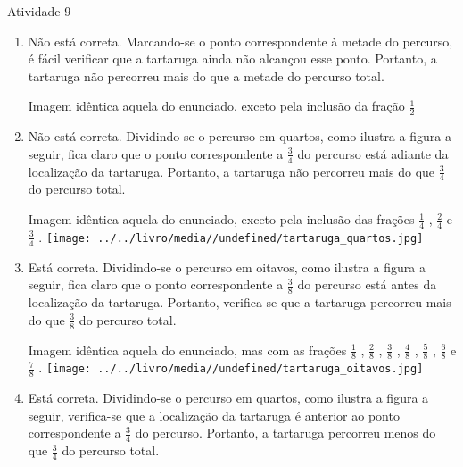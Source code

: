 \documentclass[oneside]{book}
\begin{document}
\begin{multicols}{2}
\begin{resposta*}{Atividade 9}
\begin{enumerate} [\quad a)] %
  \item     Não está correta. Marcando-se o ponto correspondente à metade do percurso, é fácil verificar que a tartaruga ainda não alcançou esse ponto. Portanto, a tartaruga não percorreu mais do que a metade do percurso total.          

\begin{imagem*}[breakable]{}{}   Imagem idêntica aquela do enunciado, exceto pela inclusão da fração   $\frac{1}{2}$  \end{imagem*}

  \item     Não está correta. Dividindo-se o percurso em quartos, como ilustra a figura a seguir, fica claro que o ponto correspondente a     $\frac{3}{4}$     do percurso está adiante da localização da tartaruga. Portanto, a tartaruga não percorreu mais do que     $\frac{3}{4}$     do percurso total.          

\begin{imagem*}[breakable]{}{}   Imagem idêntica aquela do enunciado, exceto pela inclusão das frações   $\frac{1}{4}$  ,   $\frac{2}{4}$   e   $\frac{3}{4}$  .           \texttt{[image: ../../livro/media//undefined/tartaruga\_quartos.jpg]}   \end{imagem*}

  \item     Está correta. Dividindo-se o percurso em oitavos, como ilustra a figura a seguir, fica claro que o ponto correspondente a     $\frac{3}{8}$     do percurso está antes da localização da tartaruga. Portanto, verifica-se que a tartaruga percorreu mais do que     $\frac{3}{8}$     do percurso total.          

\begin{imagem*}[breakable]{}{}   Imagem idêntica aquela do enunciado, mas com as frações   $\frac{1}{8}$  ,   $\frac{2}{8}$  ,   $\frac{3}{8}$  ,   $\frac{4}{8}$  ,   $\frac{5}{8}$  ,   $\frac{6}{8}$   e   $\frac{7}{8}$  .           \texttt{[image: ../../livro/media//undefined/tartaruga\_oitavos.jpg]}\end{imagem*}

  \item     Está correta. Dividindo-se o percurso em quartos, como ilustra a figura a seguir, verifica-se que a localização da tartaruga é anterior ao ponto correspondente a     $\frac{3}{4}$     do percurso. Portanto, a tartaruga percorreu menos do que     $\frac{3}{4}$     do percurso total.         


\end{enumerate}
\end{resposta*}
\end{multicols}
\end{document}
